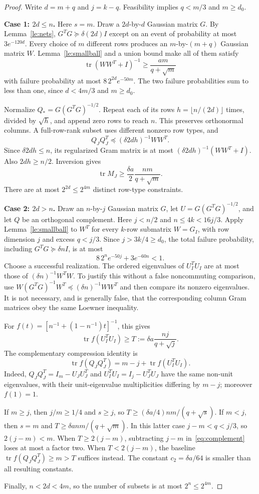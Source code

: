 \documentclass[11pt]{article}
\theoremstyle{remark}\newtheorem{remark}[theorem]{Remark}
\newcommand{\tr}{\operatorname{tr}}
\begin{document}
\begin{proof}
Write $d=m+q$ and $j=k-q$. Feasibility implies $q<m/3$ and $m\ge d_0$.

\textbf{Case 1: $2d\le n$.} Here $s=m$. Draw a $2d$-by-$d$ Gaussian matrix $G$. By Lemma~\ref{le:nets}, $G^TG\succeq\delta(2d)I$ except on an event of probability at most $3e^{-120d}$. Every choice of $m$ different rows produces an $m$-by-$(m+q)$ Gaussian matrix $W$. Lemma~\ref{le:smallball} and a union bound make all of them satisfy
\[
 \tr(WW^T+I)^{-1}\ge\frac{am}{q+\sqrt m}
\]
with failure probability at most $8\,2^{2d}e^{-50m}$. The two failure probabilities sum to less than one, since $d<4m/3$ and $m\ge d_0$.

Normalize $Q_*=G(G^TG)^{-1/2}$. Repeat each of its rows $h=\lfloor n/(2d)\rfloor$ times, divided by $\sqrt h$, and append zero rows to reach $n$. This preserves orthonormal columns. A full-row-rank subset uses different nonzero row types, and
\[
 Q_JQ_J^T\preceq (\delta 2dh)^{-1}WW^T.
\]
Since $\delta 2dh\le n$, its regularized Gram matrix is at most
$(\delta 2dh)^{-1}(WW^T+I)$. Also $2dh\ge n/2$. Inversion gives
\[
 \tr M_J\ge\frac{\delta a}{2}\frac{nm}{q+\sqrt m}.
\]
There are at most $2^{2d}\le2^{4m}$ distinct row-type constraints.

\textbf{Case 2: $2d>n$.} Draw an $n$-by-$j$ Gaussian matrix $G$, let $U=G(G^TG)^{-1/2}$, and let $Q$ be an orthogonal complement. Here $j<n/2$ and $n\le4k<16j/3$. Apply Lemma~\ref{le:smallball} to $W^T$ for every $k$-row submatrix $W=G_I$, with row dimension $j$ and excess $q<j/3$. Since $j>3k/4\ge d_0$, the total failure probability, including $G^TG\succeq\delta n I$, is at most
\[
 8\,2^n e^{-50j}+3e^{-60n}<1.
\]
Choose a successful realization. The ordered eigenvalues of $U_I^TU_I$ are at most those of $(\delta n)^{-1}W^TW$. To justify this without a false noncommuting comparison, use
$W(G^TG)^{-1}W^T\preceq(\delta n)^{-1}WW^T$ and then compare its nonzero eigenvalues. It is not necessary, and is generally false, that the corresponding column Gram matrices obey the same Loewner inequality.

For $f(t)=[n^{-1}+(1-n^{-1})t]^{-1}$, this gives
\[
 \tr f(U_I^TU_I)\ge
 T:=\delta a\frac{nj}{q+\sqrt j}.
\]
The complementary compression identity is
\begin{equation}\label{eq:complement}
 \tr f(Q_JQ_J^T)=m-j+\tr f(U_I^TU_I).
\end{equation}
Indeed, $Q_JQ_J^T=I_m-U_JU_J^T$ and $U_I^TU_I=I_j-U_J^TU_J$ have the same non-unit eigenvalues, with their unit-eigenvalue multiplicities differing by $m-j$; moreover $f(1)=1$.

If $m\ge j$, then $j/m\ge1/4$ and $s\ge j$, so $T\ge(\delta a/4)nm/(q+\sqrt s)$. If $m<j$, then $s=m$ and $T\ge\delta a nm/(q+\sqrt m)$. In this latter case $j-m<q<j/3$, so $2(j-m)<m$. When $T\ge2(j-m)$, subtracting $j-m$ in~\eqref{eq:complement} loses at most a factor two. When $T<2(j-m)$, the baseline $\tr f(Q_JQ_J^T)\ge m>T$ suffices instead. The constant $c_2=\delta a/64$ is smaller than all resulting constants.

Finally, $n<2d<4m$, so the number of subsets is at most $2^n\le2^{4m}$.
\end{proof}
\end{document}
